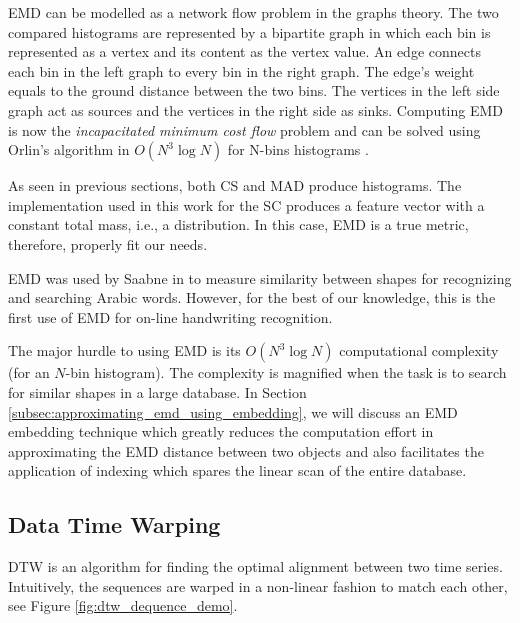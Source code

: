\iftoggle{edit-mode}{\hspace{0pt}\marginpar{EMD modeling as flow in graph}}{}
EMD can be modelled as a network flow problem in the graphs theory. 
The two compared histograms are represented by a bipartite graph in which each bin is represented as a vertex and its content as the vertex value. 
An edge connects each bin in the left graph to every bin in the right graph. 
The edge's weight equals to the ground distance between the two bins. 
The vertices in the left side graph act as sources and the vertices in the right side as sinks. 
Computing EMD is now the \emph{incapacitated minimum cost flow} problem and can be solved using Orlin's algorithm in $O(N^3 \log N)$ for N-bins histograms \cite{shirdhonkar2008approximate}.

\iftoggle{edit-mode}{\hspace{0pt}\marginpar{EMD in Feature space}}{}
As seen in previous sections, both CS and MAD produce histograms. 
The implementation used in this work for the SC produces a feature vector with a constant total mass, i.e., a distribution. 
In this case, EMD is a true metric, therefore, properly fit our needs.

\iftoggle{edit-mode}{\hspace{0pt}\marginpar{EMD in handwriting recognition}}{}
EMD was used by Saabne in \cite{saabni2013efficient} to measure similarity between shapes for recognizing and searching Arabic words. 
However, for the best of our knowledge, this is the first use of EMD for on-line handwriting recognition.

\iftoggle{edit-mode}{\hspace{0pt}\marginpar{EMD drawback}}{}
The major hurdle to using EMD is its $O\left( {{N^3}\log N} \right)$ computational complexity (for an $N$-bin histogram). 
The complexity is magnified when the task is to search for similar shapes in a large database.  
In Section \ref{subsec:approximating_emd_using_embedding}, we will discuss an EMD embedding technique which greatly reduces the computation effort in approximating the EMD distance between two objects and also facilitates the application of indexing which spares the linear scan of the entire database.



\subsection{Data Time Warping}
\label{subsec:dtw}

\iftoggle{edit-mode}{\hspace{0pt}\marginpar{Introduction}}{}
DTW is an algorithm for finding the optimal alignment between two time series. 
Intuitively, the sequences are warped in a non-linear fashion to match each other, see Figure \ref{fig:dtw_dequence_demo}.\\ 


